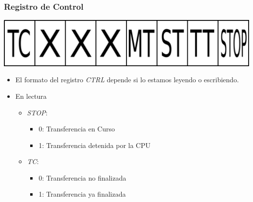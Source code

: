 \documentclass{beamer}
\begin{document}
\begin{frame}
\frametitle{Registro de Control}
  \begin{center}
      \includegraphics[scale=0.45]{cdma-ctrl.png}
  \end{center}

  \begin{itemize}
   \item El formato del registro \emph{CTRL} depende si lo estamos leyendo o escribiendo.
  \end{itemize}
  \begin{itemize}
     \item En lectura
     \begin{itemize}
        \item \emph{STOP}:
	  \begin{itemize}
	      \item 0: Transferencia en Curso
	      \item 1: Transferencia detenida por la CPU
	  \end{itemize}
        \item \emph{TC}:
	  \begin{itemize}
	      \item 0: Transferencia no finalizada
	      \item 1: Transferencia ya finalizada
	  \end{itemize}
     \end{itemize}
  \end{itemize}
\end{frame}
\end{document}
